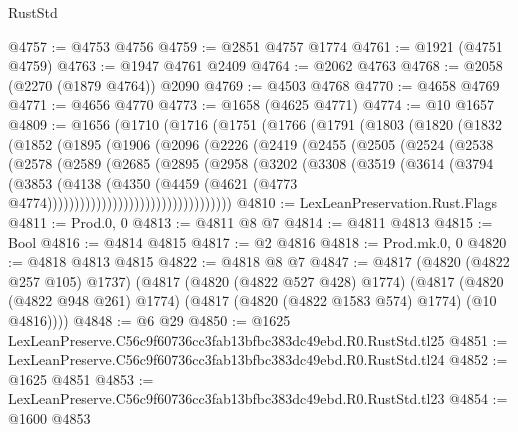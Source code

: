 \begin{lexlean}{RustStd}
\begin{coremodule}
@4757 := @4753 @4756
@4759 := @2851 @4757 @1774
@4761 := @1921 (@4751 @4759)
@4763 := @1947 @4761 @2409
@4764 := @2062 @4763
@4768 := @2058 (@2270 (@1879 @4764)) @2090
@4769 := @4503 @4768
@4770 := @4658 @4769
@4771 := @4656 @4770
@4773 := @1658 (@4625 @4771)
@4774 := @10 @1657
@4809 := @1656
    (@1710
      (@1716
        (@1751
          (@1766
            (@1791
              (@1803
                (@1820
                  (@1832
                    (@1852
                      (@1895
                        (@1906
                          (@2096
                            (@2226
                              (@2419
                                (@2455
                                  (@2505
                                    (@2524
                                      (@2538
                                        (@2578
                                          (@2589
                                            (@2685
                                              (@2895
                                                (@2958
                                                  (@3202
                                                    (@3308
                                                      (@3519
                                                        (@3614
                                                          (@3794
                                                            (@3853
                                                              (@4138
                                                                (@4350
                                                                  (@4459
                                                                    (@4621
                                                                      (@4773
                                                                        @4774))))))))))))))))))))))))))))))))))
@4810 := LexLeanPreservation.Rust.Flags
@4811 := Prod.{0, 0}
@4813 := @4811 @8 @7
@4814 := @4811 @4813
@4815 := Bool
@4816 := @4814 @4815
@4817 := @2 @4816
@4818 := Prod.mk.{0, 0}
@4820 := @4818 @4813 @4815
@4822 := @4818 @8 @7
@4847 := @4817
    (@4820 (@4822 @257 @105) @1737)
    (@4817
      (@4820 (@4822 @527 @428) @1774)
      (@4817 (@4820 (@4822 @948 @261) @1774) (@4817 (@4820 (@4822 @1583 @574) @1774) (@10 @4816))))
@4848 := @6 @29
@4850 := @1625 LexLeanPreserve.C56c9f60736cc3fab13bfbc383dc49ebd.R0.RustStd.tl25
@4851 := LexLeanPreserve.C56c9f60736cc3fab13bfbc383dc49ebd.R0.RustStd.tl24
@4852 := @1625 @4851
@4853 := LexLeanPreserve.C56c9f60736cc3fab13bfbc383dc49ebd.R0.RustStd.tl23
@4854 := @1600 @4853

\end{coremodule}
\end{lexlean}
